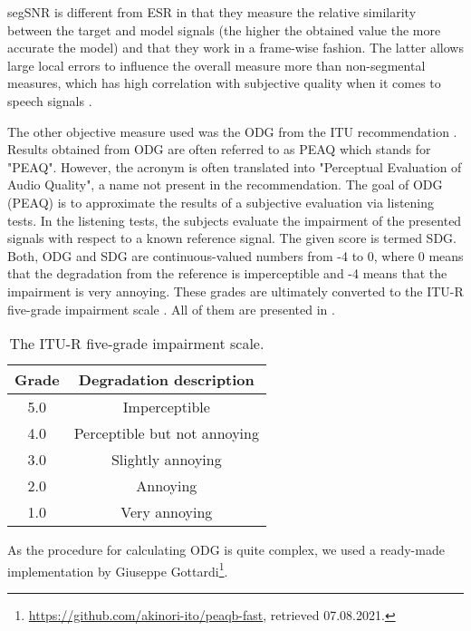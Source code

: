 \Ac{segSNR} is different from \ac{ESR} in that they measure the relative similarity between the target and model signals (the higher the obtained value the more accurate the model) and that they work in a frame-wise fashion. The latter allows large local errors to influence the overall measure more than non-segmental measures, which has high correlation with subjective quality when it comes to speech signals \cite{Hansen98}.

The other objective measure used was the \ac{ODG} from the \ac{ITU} recommendation \cite{ITU1387}. 
Results obtained from \ac{ODG} are often referred to as \acs{PEAQ} which stands for "\acl{PEAQ}". However, the acronym is often translated into "Perceptual Evaluation of Audio Quality", a name not present in the recommendation. The goal of \ac{ODG} (\acs{PEAQ}) is to approximate the results of a subjective evaluation via listening tests. In the listening tests, the subjects evaluate the impairment of the presented signals with respect to a known reference signal. The given score is termed \ac{SDG}. Both, \ac{ODG} and \ac{SDG} are continuous-valued numbers from -4 to 0, where 0 means that the degradation from the reference is imperceptible and -4 means that the impairment is very annoying. These grades are ultimately converted to the ITU-R five-grade impairment scale \cite{ITU1387}. All of them are presented in .

\begin{table}
  \centering
  \caption{The ITU-R five-grade impairment scale.}
  \begin{tabular}{c | c}
    \toprule
    \textbf{Grade} & \textbf{Degradation description} \\ \midrule
    5.0 & Imperceptible \\
    4.0 & Perceptible but not annoying \\
    3.0 & Slightly annoying \\
    2.0 & Annoying \\
    1.0 & Very annoying\\
  \end{tabular}
  \label{tab:itu_impairment_scale}
\end{table}

As the procedure for calculating \ac{ODG} is quite complex, we used a ready-made implementation by Giuseppe Gottardi\footnote{\url{https://github.com/akinori-ito/peaqb-fast}, retrieved 07.08.2021.}.
